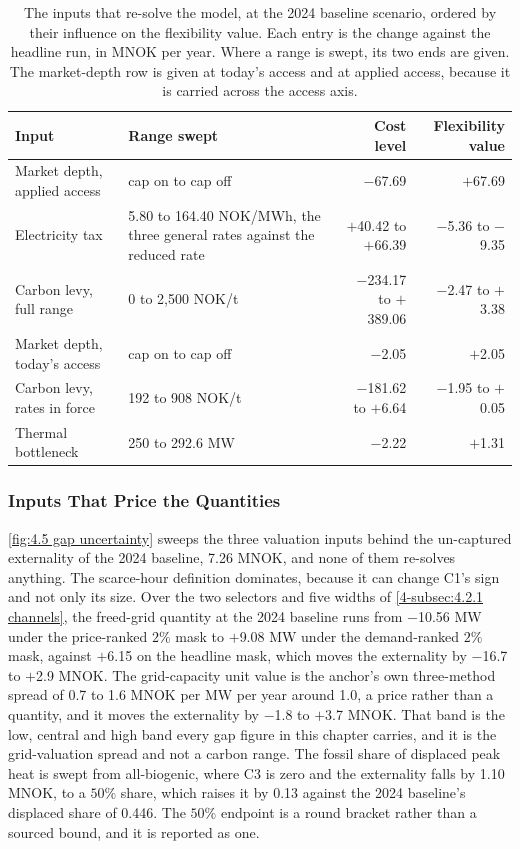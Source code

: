 \begin{table}[htbp]
\centering
\caption{The inputs that re-solve the model, at the 2024 baseline scenario, ordered by their influence on the flexibility value. Each entry is the change against the headline run, in MNOK per year. Where a range is swept, its two ends are given. The market-depth row is given at today's access and at applied access, because it is carried across the access axis.}
\small
\begin{tabular}{p{4.0cm} p{4.4cm} r r}
\toprule
\textbf{Input} & \textbf{Range swept} & \textbf{Cost level} & \textbf{Flexibility value} \\
\midrule
Market depth, applied access & cap on to cap off & $-$67.69 & $+$67.69 \\
Electricity tax & 5.80 to 164.40 NOK/MWh, the three general rates against the reduced rate & $+$40.42 to $+$66.39 & $-$5.36 to $-$9.35 \\
Carbon levy, full range & 0 to 2{,}500 NOK/t & $-$234.17 to $+$389.06 & $-$2.47 to $+$3.38 \\
Market depth, today's access & cap on to cap off & $-$2.05 & $+$2.05 \\
Carbon levy, rates in force & 192 to 908 NOK/t & $-$181.62 to $+$6.64 & $-$1.95 to $+$0.05 \\
Thermal bottleneck & 250 to 292.6 MW & $-$2.22 & $+$1.31 \\
\bottomrule
\end{tabular}
\label{tab:4.5 sensitivity}
\end{table}

\subsubsection{Inputs That Price the Quantities}
\label{4-subsec:4.4.2 valuation sensitivities}

\autoref{fig:4.5 gap uncertainty} sweeps the three valuation inputs behind the un-captured externality of the 2024 baseline, 7.26 MNOK, and none of them re-solves anything. The scarce-hour definition dominates, because it can change C1's sign and not only its size. Over the two selectors and five widths of \autoref{4-subsec:4.2.1 channels}, the freed-grid quantity at the 2024 baseline runs from $-$10.56 MW under the price-ranked $2\%$ mask to $+$9.08 MW under the demand-ranked $2\%$ mask, against $+$6.15 on the headline mask, which moves the externality by $-$16.7 to $+$2.9 MNOK. The grid-capacity unit value is the anchor's own three-method spread of 0.7 to 1.6 MNOK per MW per year around 1.0, a price rather than a quantity, and it moves the externality by $-$1.8 to $+$3.7 MNOK. That band is the low, central and high band every gap figure in this chapter carries, and it is the grid-valuation spread and not a carbon range. The fossil share of displaced peak heat is swept from all-biogenic, where C3 is zero and the externality falls by 1.10 MNOK, to a $50\%$ share, which raises it by 0.13 against the 2024 baseline's displaced share of 0.446. The $50\%$ endpoint is a round bracket rather than a sourced bound, and it is reported as one.



